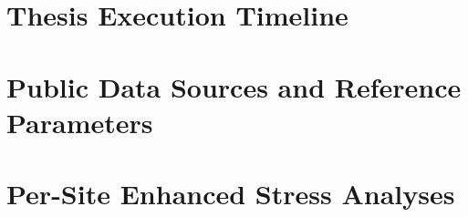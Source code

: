 \documentclass[mtech,smplmath]{iitmdissertation}
\begin{document}
  \prematter
  \printCertificate

  \begin{FrontMatter}
    \printGlossaryAndAbbreviations
  \end{FrontMatter}

  \begin{MainMatter}
    
    
    
        
    
       
    
    

    \appendix
    \chapter{Thesis Execution Timeline}
    
    \chapter{Public Data Sources and Reference Parameters}
    
    \chapter{Per-Site Enhanced Stress Analyses}
    \label{app:site_profiles}
    
  \end{MainMatter}

  \begin{BackMatter}
  \end{BackMatter}
\end{document}
